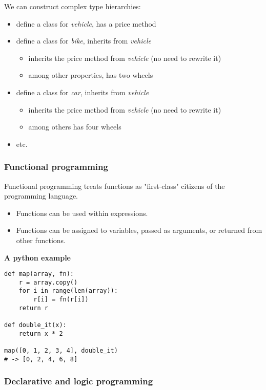 \documentclass[12pt]{article}
\begin{document}
We can construct complex type hierarchies:
\begin{itemize}
    \item define a class for \emph{vehicle}, has a price method
    \item define a class for \emph{bike}, inherits from \emph{vehicle}
    \begin{itemize}
        \item inherits the price method from \emph{vehicle} (no need to rewrite it)
        \item among other properties, has two wheels
    \end{itemize}
    \item define a class for \emph{car}, inherits from \emph{vehicle}
    \begin{itemize}
        \item inherits the price method from \emph{vehicle} (no need to rewrite it)
        \item among others has four wheels
    \end{itemize}
    \item etc.
\end{itemize}




\subsubsection{Functional programming}

Functional programming treats functions as "first-class" citizens of the programming language.

\begin{itemize}
    \item Functions can be used within expressions.
    \item Functions can be assigned to variables, passed as arguments, or returned from other functions.
\end{itemize}
\textbf{A python example}
\begin{lstlisting}
def map(array, fn):
    r = array.copy()
    for i in range(len(array)):
        r[i] = fn(r[i])
    return r

def double_it(x):
    return x * 2

map([0, 1, 2, 3, 4], double_it)
# -> [0, 2, 4, 6, 8]
\end{lstlisting}

\subsubsection{Declarative and logic programming}
\end{document}
